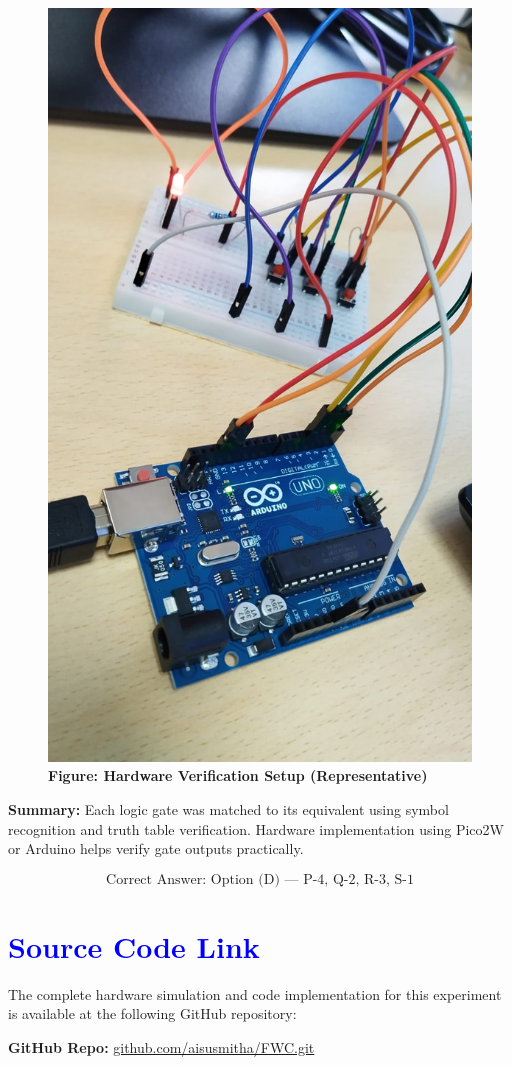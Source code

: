\documentclass[twocolumn]{article}
\begin{document}
\begin{figure}[h]
    \centering
    \includegraphics[width=0.95\linewidth]{arm.jpeg}
        \caption*{\textbf{Figure: Hardware Verification Setup (Representative)}}
\end{figure}

\textbf{Summary:}  
Each logic gate was matched to its equivalent using symbol recognition and truth table verification. Hardware implementation using Pico2W or Arduino helps verify gate outputs practically.

\[
\boxed{\text{Correct Answer: Option (D) — P-4, Q-2, R-3, S-1}}
\]

\section*{\textcolor{blue}{Source Code Link}}
The complete hardware simulation and code implementation for this experiment is available at the following GitHub repository:

\textbf{GitHub Repo:} \href{https://github.com/aisusmitha/FWC.git}{github.com/aisusmitha/FWC.git}
\end{document}

